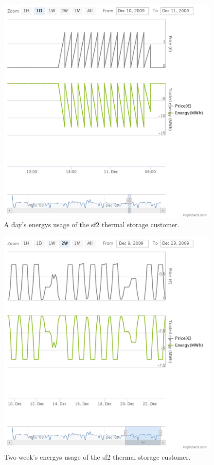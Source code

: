 \begin{figure}[h!]
  \includegraphics[width=\linewidth]{sf2-thermal-daily.png}
  \caption{A day's energys usage of the sf2 thermal storage customer.}
  \label{fig:day-thermal}
\end{figure}

\begin{figure}[h!]
  \includegraphics[width=\linewidth]{sf2-thermal-week.png}
  \caption{Two week's energys usage of the sf2 thermal storage customer.}
  \label{fig:thermal-week}
\end{figure}

